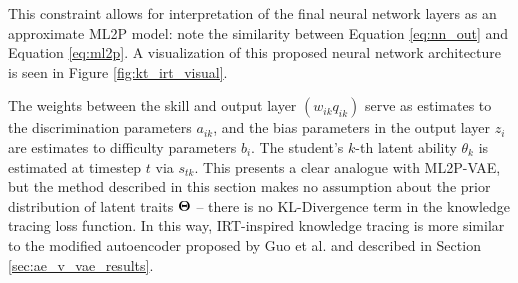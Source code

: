 This constraint allows for interpretation of the final neural network layers as an approximate ML2P model: note the similarity between Equation \ref{eq:nn_out} and Equation \ref{eq:ml2p}. A visualization of this proposed neural network architecture is seen in Figure \ref{fig:kt_irt_visual}.


The weights between the skill and output layer $(w_{ik}q_{ik})$ serve as estimates to the discrimination parameters $a_{ik}$, and the bias parameters in the output layer $z_i$ are estimates to difficulty parameters $b_i$. The student's $k$-th latent ability $\theta_k$ is estimated at timestep $t$ via $s_{tk}$. This presents a clear analogue with ML2P-VAE, but the method described in this section makes no assumption about the prior distribution of latent traits $\boldsymbol{\Theta}$ -- there is no KL-Divergence term in the knowledge tracing loss function. In this way, IRT-inspired knowledge tracing is more similar to the modified autoencoder proposed by Guo et al. \cite{guo2017} and described in Section \ref{sec:ae_v_vae_results}.

